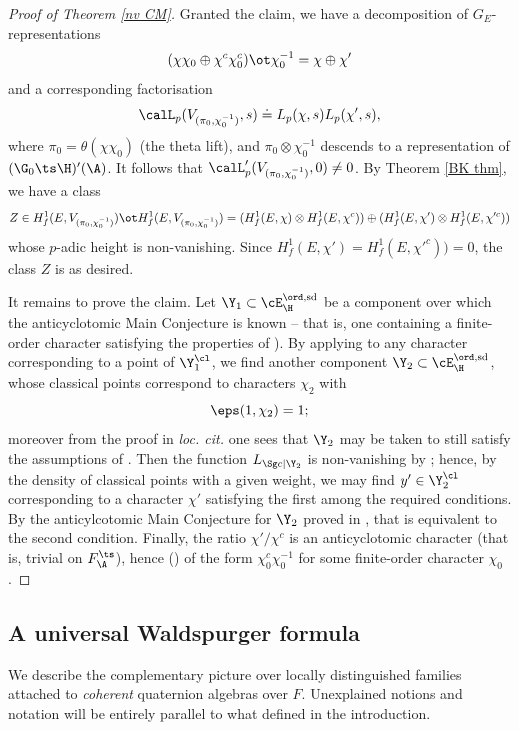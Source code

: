 \begin{proof}[Proof of Theorem \ref{nv CM}]
 Granted the claim, we have a decomposition of $G_{E}$-representations
$$ (\chi\chi_{0}\oplus \chi^{c}\chi_{0}^{c})\ot \chi_{0}^{-1} =\chi \oplus \chi' $$
and a corresponding factorisation
$$ \calL_{p}(V_{(\pi_{0}, \chi_{0}^{-1})},s)\doteq L_{p}(\chi,s) L_{p}(\chi',s ), $$
 where $\pi_{0}=\theta(\chi\chi_{0})$ (the theta lift), and $\pi_{0}\otimes\chi_{0}^{-1}$ descends to a representation of $(\G_{0}\ts\H)'(\A)$.  It follows that  $\calL_{p}'(V_{(\pi_{0}, \chi_{0}^{-1})},0)\neq 0$. By Theorem \ref{BK thm}, we have a class
 $$Z \in H^{1}_{f}({E}, V_{(\pi_{0}, \chi_{0}^{-1})}) \ot H^{1}_{f}({E}, V_{(\pi_{0}, \chi_{0}^{-1})}) =    (H^{1}_{f}({E},\chi) \otimes H^{1}_{f}({E},\chi^{c}))
 \oplus (H^{1}_{f}({E},\chi')\otimes H^{1}_{f}({E},\chi'^{c})) $$
  whose $p$-adic height is non-vanishing. Since $H^{1}_{f}({E},\chi')=H^{1}_{f}({E},\chi'^{c})) =0$, the class $Z$ is as desired.


It remains to prove the claim. Let $\Y_{1}\subset \cE_{\H}^{\ord, {\rm sd}}$ be a component over which the anticyclotomic Main Conjecture is known -- that is, one containing a finite-order character satisfying the properties of \cite{hida-quad}). By applying  \cite[Lemma 2.5]{bur-d} to any character corresponding to a point of $\Y_{1}^{\cl}$, we find another component $\Y_{2}\subset \cE_{\H}^{\ord, {\rm sd}}$,  whose classical points correspond to characters $\chi_{2}$ with $$\eps(1, \chi_{2})=1;$$
 moreover from the proof in \emph{loc. cit.}  one sees that $\Y_{2}$ may be taken to still satisfy the assumptions of \cite{hida-quad}. Then the function $L_{\Sg c|\Y_{2}}$ is non-vanishing by \cite{hsieh-mu}; hence, by the density of classical points with a given weight, we may find $y'\in \Y_{2}^{\cl}$ corresponding to a character $\chi'$ satisfying the first among the required  conditions. By the anticylcotomic Main Conjecture for $\Y_{2}$ proved in \cite{hida-mc,hida-quad}, that is equivalent to the second condition. Finally, the ratio $\chi'/\chi^{c} $ is an anticyclotomic character (that is, trivial on $F_{\A}^{\ts}$), hence (\cite[Lemma 5.3.1]{28}) of the form $\chi_{0}^{c}\chi_{0}^{-1}$ for some finite-order character $\chi_{0}$.
\end{proof}

\subsection{A universal  Waldspurger formula}
We describe  the complementary picture over locally distinguished families  attached to \emph{coherent} quaternion algebras over $F$.  Unexplained notions and  notation will be entirely parallel to what defined in the introduction.


